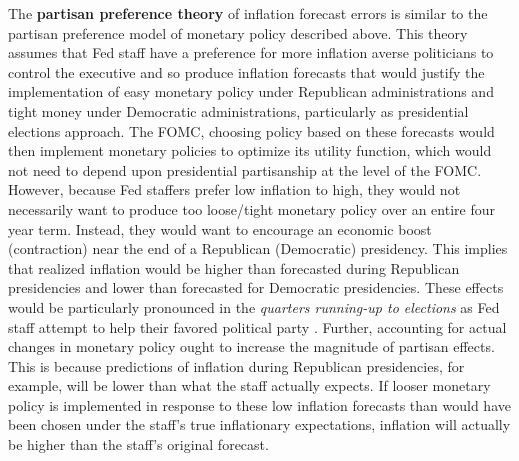 \documentclass[a4paper]{article}\usepackage{graphicx, color}
\begin{document}
The {\bf{partisan preference theory}} of inflation forecast errors is similar to the partisan preference model of monetary policy described above. This theory assumes that Fed staff have a preference for more inflation averse politicians to control the executive and so produce inflation forecasts that would justify the implementation of easy monetary policy under Republican administrations and tight money under Democratic administrations, particularly as presidential elections approach. The FOMC, choosing policy based on these forecasts would then implement monetary policies to optimize its utility function, which would not need to depend upon presidential partisanship at the level of the FOMC. However, because Fed staffers prefer low inflation to high, they would not necessarily want to produce too loose/tight monetary policy over an entire four year term. Instead, they would want to encourage an economic boost (contraction) near the end of a Republican (Democratic) presidency. This implies that realized inflation would be higher than forecasted during Republican presidencies and lower than forecasted for Democratic presidencies. These effects would be particularly pronounced in the {\emph{quarters running-up to elections}} as Fed staff attempt to help their favored political party \citep{Beck1987,Grier1987}. Further, accounting for actual changes in monetary policy ought to increase the magnitude of partisan effects. This is because predictions of inflation during Republican presidencies, for example, will be lower than what the staff actually expects. If looser monetary policy is implemented in response to these low inflation forecasts than would have been chosen under the staff's true inflationary expectations, inflation will actually be higher than the staff's original forecast.
\end{document}
